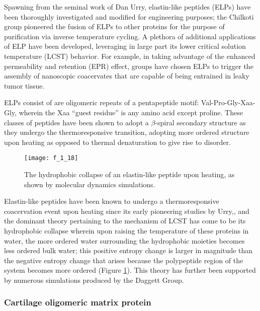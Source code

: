 \begin{refsection}
Spawning from the seminal work of Dan Urry, elastin-like peptides (ELPs) have
been thoroughly investigated and modified for engineering purposes; the Chilkoti
group pioneered the fusion of ELPs to other proteins for the purpose of
purification via inverse temperature cycling.\cite{Meyer1999} A plethora of
additional applications of ELP have been developed, leveraging in large part its
lower critical solution temperature (LCST) behavior.\cite{Urry2002} For example,
in taking advantage of the enhanced permeability and retention (EPR) effect,
groups have chosen ELPs to trigger the assembly of nanoscopic coacervates
 that are capable of being entrained in leaky tumor
tissue.\cite{Nakayama2010,DeLasHerasAlarcon2005} 

ELPs consist of are oligomeric repeats of a pentapeptide motif:
Val-Pro-Gly-Xaa-Gly, wherein the Xaa ``guest residue'' is any amino acid except
proline. These classes of peptides have been shown to adopt a ${\beta}$-spiral
secondary structure as they undergo the thermoresponsive transition, adopting 
more ordered structure upon heating as opposed to thermal denaturation to give
rise to disorder.\cite{Urry1988,Urry1986,Urry1985}
\begin{figure}[h!] \centering \texttt{[image: f\_1\_18]}
    \caption[Hydrophobic collapse of elastin-like peptides.]{The hydrophobic collapse of an elastin-like peptide upon heating, as shown by
        molecular dynamics simulations.\cite{Li2001}}\label{fig:elastin_diagram} \end{figure}
Elastin-like peptides have been known to undergo a thermoresponsive coacervation
event upon heating since its early pioneering studies by
Urry,\cite{URRY1974,Urry1985}, and the dominant theory pertaining to the
mechanism of LCST has come to be its hydrophobic collapse wherein upon raising
the temperature of these proteins in water, the more ordered water surrounding
the hydrophobic moieties becomes less ordered bulk water; this positive entropy
change is larger in magnitude than the negative entropy change that arises
because the polypeptide region of the system becomes more
ordered (Figure \ref{fig:elastin_diagram}).\cite{Urry1993} This theory has further been supported by numerous
simulations produced by the Daggett Group.\cite{Li2001,Li2003,Li2001a,Li2002a}

\subsubsection{Cartilage oligomeric matrix protein}


\end{refsection}
